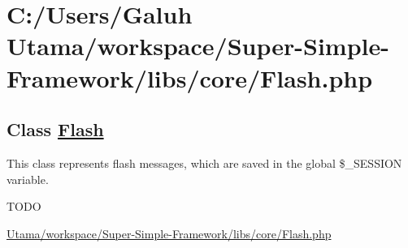 \hypertarget{_c_1_2_users_2_galuh_01_utama_2workspace_2_super-_simple-_framework_2libs_2core_2_flash_8php-example}{\section{\-C\-:/\-Users/\-Galuh Utama/workspace/\-Super-\/\-Simple-\/\-Framework/libs/core/\-Flash.\-php}
}
\subsection*{\-Class \hyperlink{class_flash}{\-Flash}}

\-This class represents flash messages, which are saved in the global \$\-\_\-\-S\-E\-S\-S\-I\-O\-N variable. 

\-T\-O\-D\-O


\begin{DoxyCodeInclude}
\end{DoxyCodeInclude}
 \hyperlink{_flash_8php_source}{\-Utama/workspace/\-Super-\/\-Simple-\/\-Framework/libs/core/\-Flash.\-php} 